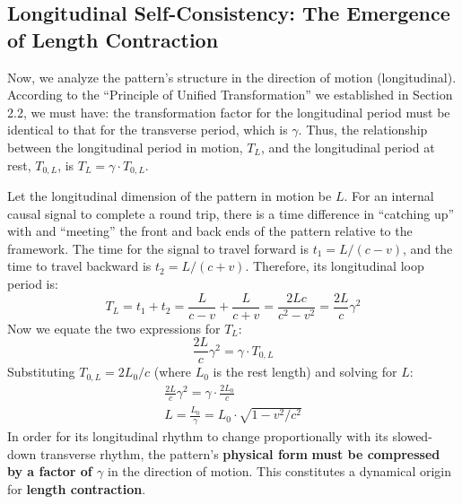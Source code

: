 \documentclass[11pt, a4paper]{article}
\begin{document}
\subsection{Longitudinal Self-Consistency: The Emergence of Length Contraction}
Now, we analyze the pattern's structure in the direction of motion (longitudinal). According to the ``Principle of Unified Transformation'' we established in Section 2.2, we must have: the transformation factor for the longitudinal period must be identical to that for the transverse period, which is $\gamma$. Thus, the relationship between the longitudinal period in motion, $T_L$, and the longitudinal period at rest, $T_{0,L}$, is $T_L = \gamma \cdot T_{0,L}$.

Let the longitudinal dimension of the pattern in motion be $L$. For an internal causal signal to complete a round trip, there is a time difference in ``catching up'' with and ``meeting'' the front and back ends of the pattern relative to the framework. The time for the signal to travel forward is $t_1 = L / (c-v)$, and the time to travel backward is $t_2 = L / (c+v)$. Therefore, its longitudinal loop period is:
\begin{equation}
    T_L = t_1 + t_2 = \frac{L}{c-v} + \frac{L}{c+v} = \frac{2Lc}{c^2-v^2} = \frac{2L}{c}\gamma^2
\end{equation}
Now we equate the two expressions for $T_L$:
\begin{equation}
    \frac{2L}{c}\gamma^2 = \gamma \cdot T_{0,L}
\end{equation}
Substituting $T_{0,L}=2L_0/c$ (where $L_0$ is the rest length) and solving for $L$:
\begin{gather}
    \frac{2L}{c}\gamma^2 = \gamma \cdot \frac{2L_0}{c} \\
    L = \frac{L_0}{\gamma} = L_0 \cdot \sqrt{1 - v^2/c^2}
\end{gather}
In order for its longitudinal rhythm to change proportionally with its slowed-down transverse rhythm, the pattern's \textbf{physical form} \textbf{must be compressed by a factor of $\gamma$} in the direction of motion. This constitutes a dynamical origin for \textbf{length contraction}.
\end{document}
